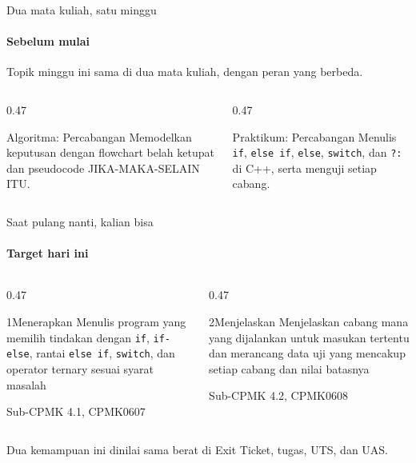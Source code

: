 \documentclass[t]{beamer}
\begin{document}

\begin{frame}{Dua mata kuliah, satu minggu}
\framesubtitle{Sebelum mulai}
Topik minggu ini sama di dua mata kuliah, dengan peran yang berbeda.
\vspace{10pt}

\begin{columns}[T]
\begin{column}{0.47\textwidth}
\begin{Blok}{Algoritma: Percabangan}
Memodelkan keputusan dengan flowchart belah ketupat dan pseudocode JIKA-MAKA-SELAIN ITU.
\end{Blok}
\end{column}
\begin{column}{0.47\textwidth}
\begin{BlokGelap}{Praktikum: Percabangan}
Menulis \texttt{if}, \texttt{else if}, \texttt{else}, \texttt{switch}, dan \texttt{?:} di C++, serta menguji setiap cabang.
\end{BlokGelap}
\end{column}
\end{columns}
\end{frame}

\begin{frame}{Saat pulang nanti, kalian bisa}
\framesubtitle{Target hari ini}
\begin{columns}[T]
\begin{column}{0.47\textwidth}
\begin{Langkah}{1}{Menerapkan}
Menulis program yang memilih tindakan dengan \texttt{if}, \texttt{if-else}, rantai \texttt{else if}, \texttt{switch}, dan operator ternary sesuai syarat masalah

{\footnotesize\color{ITERAInkMuted}Sub-CPMK 4.1, CPMK0607}
\end{Langkah}
\end{column}
\begin{column}{0.47\textwidth}
\begin{Langkah}{2}{Menjelaskan}
Menjelaskan cabang mana yang dijalankan untuk masukan tertentu dan merancang data uji yang mencakup setiap cabang dan nilai batasnya

{\footnotesize\color{ITERAInkMuted}Sub-CPMK 4.2, CPMK0608}
\end{Langkah}
\end{column}
\end{columns}
\vspace{8pt}
\begin{Catatan}
Dua kemampuan ini dinilai sama berat di Exit Ticket, tugas, UTS, dan UAS.
\end{Catatan}
\end{frame}
\end{document}
